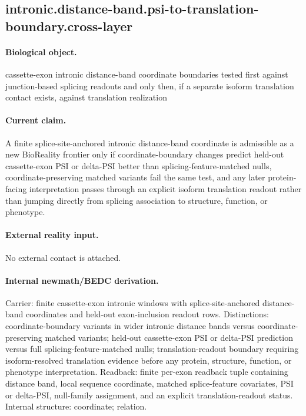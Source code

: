 \subsection{intronic.distance-band.psi-to-translation-boundary.cross-layer}

\paragraph{Biological object.} cassette-exon intronic distance-band coordinate boundaries tested first against junction-based splicing readouts and only then, if a separate isoform translation contact exists, against translation realization

\paragraph{Current claim.} A finite splice-site-anchored intronic distance-band coordinate is admissible as a new BioReality frontier only if coordinate-boundary changes predict held-out cassette-exon PSI or delta-PSI better than splicing-feature-matched nulls, coordinate-preserving matched variants fail the same test, and any later protein-facing interpretation passes through an explicit isoform translation readout rather than jumping directly from splicing association to structure, function, or phenotype.

\paragraph{External reality input.}
No external contact is attached.

\paragraph{Internal newmath/BEDC derivation.} Carrier: finite cassette-exon intronic windows with splice-site-anchored distance-band coordinates and held-out exon-inclusion readout rows. Distinctions: coordinate-boundary variants in wider intronic distance bands versus coordinate-preserving matched variants; held-out cassette-exon PSI or delta-PSI prediction versus full splicing-feature-matched nulls; translation-readout boundary requiring isoform-resolved translation evidence before any protein, structure, function, or phenotype interpretation. Readback: finite per-exon readback tuple containing distance band, local sequence coordinate, matched splice-feature covariates, PSI or delta-PSI, null-family assignment, and an explicit translation-readout status. Internal structure: coordinate; relation.

